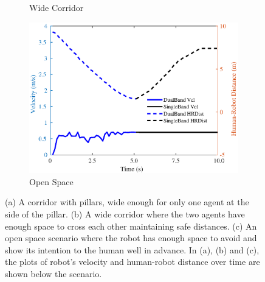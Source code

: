 \begin{figure}[!h]
\begin{subfigure}{.3\columnwidth}
      \caption{Wide Corridor}
    \end{subfigure}
    \hspace{-0.3cm}
    \begin{subfigure}{.3\columnwidth}
      \includegraphics[width=\linewidth]{images/chapter4/w_cor.eps}
      \caption{Open Space}
    \end{subfigure}
    \caption{(a) A corridor with pillars, wide enough for only one agent at the side of the pillar. (b) A wide corridor where the two agents have enough space to cross each other maintaining safe distances. (c) An open space scenario where the robot has enough space to avoid and show its intention to the human well in advance. In (a), (b) and (c), the plots of robot's velocity and human-robot distance over time are shown below the scenario.}
    \label{fig:other_scenes}
    \vspace{-0.4cm}
\end{figure}

